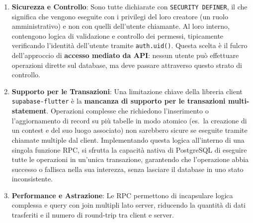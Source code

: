 \begin{enumerate}
    \item \textbf{Sicurezza e Controllo}: Sono tutte dichiarate con \texttt{SECURITY DEFINER}, il che significa che vengono eseguite con i privilegi del loro creatore (un ruolo amministrativo) e non con quelli dell'utente chiamante.
    Al loro interno, contengono logica di validazione e controllo dei permessi, tipicamente verificando l'identità dell'utente tramite \texttt{auth.uid()}.
    Questa scelta è il fulcro dell'approccio di \textbf{accesso mediato da API}: nessun utente può effettuare operazioni dirette sul database, ma deve passare attraverso questo strato di controllo.

    \item \textbf{Supporto per le Transazioni}: Una limitazione chiave della libreria client \texttt{supabase-flutter} è la \textbf{mancanza di supporto per le transazioni multi-statement}.
    Operazioni complesse che richiedono l'inserimento o l'aggiornamento di record su più tabelle in modo atomico (es.\ la creazione di un contest e del suo luogo associato) non sarebbero sicure se eseguite tramite chiamate multiple dal client.
    Implementando questa logica all'interno di una singola funzione RPC, si sfrutta la capacità nativa di PostgreSQL di eseguire tutte le operazioni in un'unica transazione, garantendo che l'operazione abbia successo o fallisca nella sua interezza, senza lasciare il database in uno stato inconsistente.

    \item \textbf{Performance e Astrazione}: Le RPC permettono di incapsulare logica complessa e query con join multipli lato server, riducendo la quantità di dati trasferiti e il numero di round-trip tra client e server.
\end{enumerate}

